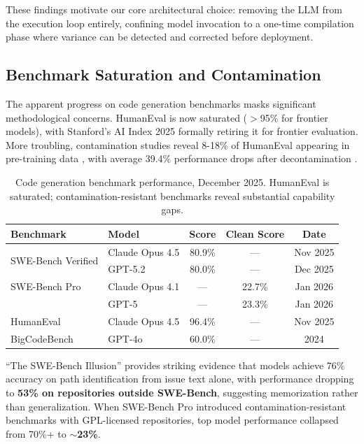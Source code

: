 \documentclass[11pt]{article}
\begin{document}
These findings motivate our core architectural choice: removing the LLM from the execution loop entirely, confining model invocation to a one-time compilation phase where variance can be detected and corrected before deployment.

\subsection{Benchmark Saturation and Contamination}

The apparent progress on code generation benchmarks masks significant methodological concerns. HumanEval is now saturated ($>$95\% for frontier models), with Stanford's AI Index 2025 formally retiring it for frontier evaluation. More troubling, contamination studies reveal 8-18\% of HumanEval appearing in pre-training data \citep{yang2023rethinking}, with average 39.4\% performance drops after decontamination \citep{xu2024contamination}.

\begin{table}[ht]
\centering
\caption{Code generation benchmark performance, December 2025. HumanEval is saturated; contamination-resistant benchmarks reveal substantial capability gaps.}
\label{tab:benchmarks}
\begin{tabular}{llccc}
\toprule
Benchmark & Model & Score & Clean Score & Date \\
\midrule
\multirow{2}{*}{SWE-Bench Verified} & Claude Opus 4.5 & 80.9\% & --- & Nov 2025 \\
 & GPT-5.2 & 80.0\% & --- & Dec 2025 \\
\midrule
SWE-Bench Pro & Claude Opus 4.1 & --- & 22.7\% & Jan 2026 \\
 & GPT-5 & --- & 23.3\% & Jan 2026 \\
\midrule
HumanEval & Claude Opus 4.5 & 96.4\% & --- & Nov 2025 \\
\midrule
BigCodeBench & GPT-4o & 60.0\% & --- & 2024 \\
\bottomrule
\end{tabular}
\end{table}

``The SWE-Bench Illusion'' \citep{shi2025swebenchillusion} provides striking evidence that models achieve 76\% accuracy on path identification from issue text alone, with performance dropping to \textbf{53\% on repositories outside SWE-Bench}, suggesting memorization rather than generalization. When SWE-Bench Pro introduced contamination-resistant benchmarks with GPL-licensed repositories, top model performance collapsed from 70\%+ to \textbf{$\sim$23\%}.
\end{document}
